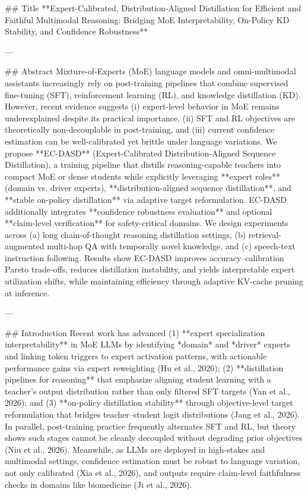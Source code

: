 ## Title  
**Expert-Calibrated, Distribution-Aligned Distillation for Efficient and Faithful Multimodal Reasoning: Bridging MoE Interpretability, On-Policy KD Stability, and Confidence Robustness**

---

## Abstract  
Mixture-of-Experts (MoE) language models and omni-multimodal assistants increasingly rely on post-training pipelines that combine supervised fine-tuning (SFT), reinforcement learning (RL), and knowledge distillation (KD). However, recent evidence suggests (i) expert-level behavior in MoE remains underexplained despite its practical importance, (ii) SFT and RL objectives are theoretically non-decouplable in post-training, and (iii) current confidence estimation can be well-calibrated yet brittle under language variations. We propose **EC-DASD** (Expert-Calibrated Distribution-Aligned Sequence Distillation), a training pipeline that distills reasoning-capable teachers into compact MoE or dense students while explicitly leveraging **expert roles** (domain vs. driver experts), **distribution-aligned sequence distillation**, and **stable on-policy distillation** via adaptive target reformulation. EC-DASD additionally integrates **confidence robustness evaluation** and optional **claim-level verification** for safety-critical domains. We design experiments across (a) long chain-of-thought reasoning distillation settings, (b) retrieval-augmented multi-hop QA with temporally novel knowledge, and (c) speech-text instruction following. Results show EC-DASD improves accuracy–calibration Pareto trade-offs, reduces distillation instability, and yields interpretable expert utilization shifts, while maintaining efficiency through adaptive KV-cache pruning at inference.  

---

## Introduction  
Recent work has advanced (1) **expert specialization interpretability** in MoE LLMs by identifying *domain* and *driver* experts and linking token triggers to expert activation patterns, with actionable performance gains via expert reweighting (Hu et al., 2026); (2) **distillation pipelines for reasoning** that emphasize aligning student learning with a teacher’s output distribution rather than only filtered SFT targets (Yan et al., 2026); and (3) **on-policy distillation stability** through objective-level target reformulation that bridges teacher–student logit distributions (Jang et al., 2026). In parallel, post-training practice frequently alternates SFT and RL, but theory shows such stages cannot be cleanly decoupled without degrading prior objectives (Niu et al., 2026). Meanwhile, as LLMs are deployed in high-stakes and multimodal settings, confidence estimation must be robust to language variation, not only calibrated (Xia et al., 2026), and outputs require claim-level faithfulness checks in domains like biomedicine (Ji et al., 2026).  

